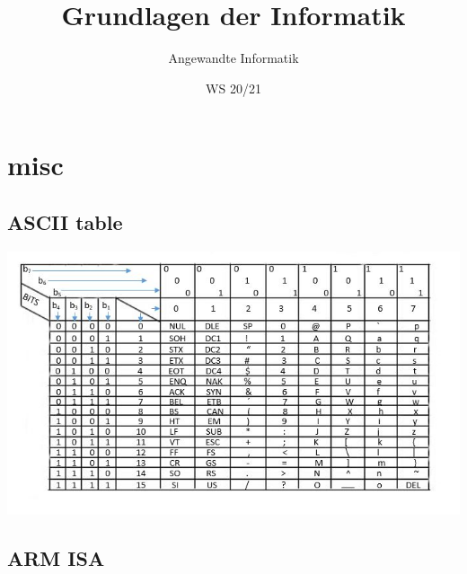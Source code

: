\documentclass[a4paper]{scrartcl}
\author{Angewandte Informatik}
\title{Grundlagen der Informatik}
\date{WS 20/21}
\begin{document}
    \section{misc}
    \subsection{ASCII table}
        \centering\includegraphics[scale=1.1]{ascii1.png}
    \subsection{ARM ISA}
\end{document}
